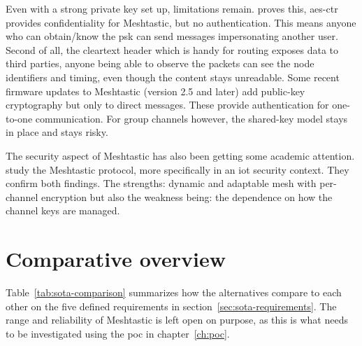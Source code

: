 Even with a strong private key set up, limitations remain. \textcite{MeshtasticEncryptionLimitations} proves this, \gls{aes}-\gls{ctr} provides confidentiality for Meshtastic, but no authentication. This means anyone who can obtain/know the \gls{psk} can send messages impersonating another user.
Second of all, the cleartext header which is handy for routing exposes data to third parties, anyone being able to observe the packets can see the node identifiers and timing, even though the content stays unreadable.
Some recent firmware updates to Meshtastic (version 2.5 and later) add public-key cryptography but only to direct messages. These provide authentication for one-to-one communication. For group channels however, the shared-key model stays in place and stays risky.

The security aspect of Meshtastic has also been getting some academic attention. \textcite{Messina2024Meshtastic} study the Meshtastic protocol, more specifically in an \gls{iot} security context. They confirm both findings. The strengths: dynamic and adaptable mesh with per-channel encryption but also the weakness being: the dependence on how the channel keys are managed.

\section{Comparative overview}%
\label{sec:sota-comparison}

Table~\ref{tab:sota-comparison} summarizes how the alternatives compare to each other on the five defined requirements in section~\ref{sec:sota-requirements}.
The range and reliability of Meshtastic is left open on purpose, as this is what needs to be investigated using the \gls{poc} in chapter~\ref{ch:poc}.

